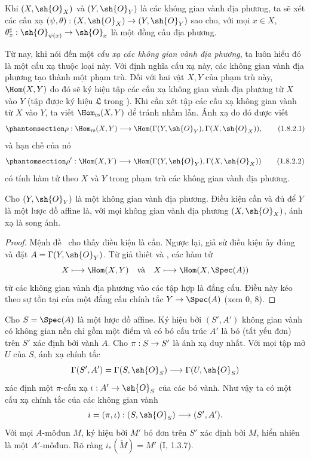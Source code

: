 \documentclass[oneside,10pt]{amsart}
\makeatletter
\newcommand{\ega@arrow}[2]{\mathchoice{#1}{#2}{#2}{#2}}
\renewcommand{\to}{\ega@arrow{\longrightarrow}{\rightarrow}}
\newcommand{\oldpage}[2][]{\marginnote{\normalfont\footnotesize\textbf{#1}~|~#2}\ignorespaces}
\let\EGAOriginalLabel\label
\renewcommand{\label}[1]{\phantomsection\EGAOriginalLabel{#1}}
\makeatother
\begin{document}
\begin{env}[1.8.2]
\label{ega2:addendum:I.1.8.2}
Khi $(X,\sh{O}_X)$ và $(Y,\sh{O}_Y)$ là các không gian vành địa
phương, ta sẽ xét các cấu xạ
$(\psi,\theta):(X,\sh{O}_X)\to(Y,\sh{O}_Y)$ sao cho, với mọi
$x\in X$, $\theta_x^\sharp:\sh{O}_{\psi(x)}\to\sh{O}_x$ là một đồng
cấu địa phương.

Từ nay, khi nói đến một
\oldpage[II]{219}
\emph{cấu xạ các không gian vành địa phương}, ta luôn hiểu đó là một
cấu xạ thuộc loại này. Với định nghĩa cấu xạ này, các không gian vành
địa phương tạo thành một phạm trù. Đối với hai vật $X,Y$ của phạm trù
này, $\Hom(X,Y)$ do đó sẽ ký hiệu tập các cấu xạ không gian vành địa
phương từ $X$ vào $Y$ (tập được ký hiệu $\mathfrak{L}$ trong
). Khi cần xét tập các cấu xạ không gian vành từ $X$ vào
$Y$, ta viết $\Hom_{\mathrm{rs}}(X,Y)$ để tránh nhầm lẫn. Ánh xạ
 do đó được viết
\begin{equation}
\label{ega2:addendum:I.1.8.2.1}
  \rho:\Hom_{\mathrm{rs}}(X,Y)
  \to\Hom(\Gamma(Y,\sh{O}_Y),\Gamma(X,\sh{O}_X)),
\tag{1.8.2.1}
\end{equation}
và hạn chế của nó
\begin{equation}
\label{ega2:addendum:I.1.8.2.2}
  \rho':\Hom(X,Y)
  \to\Hom(\Gamma(Y,\sh{O}_Y),\Gamma(X,\sh{O}_X))
\tag{1.8.2.2}
\end{equation}
có tính hàm tử theo $X$ và $Y$ trong phạm trù các không gian vành địa
phương.
\end{env}

\begin{corollary}[1.8.3]
\label{ega2:addendum:I.1.8.3}
Cho $(Y,\sh{O}_Y)$ là một không gian vành địa phương. Điều kiện cần và
đủ để $Y$ là một lược đồ affine là, với mọi không gian vành địa phương
$(X,\sh{O}_X)$, ánh xạ  là song ánh.
\end{corollary}

\begin{proof}
Mệnh đề~ cho thấy điều kiện là cần. Ngược lại, giả sử
điều kiện ấy đúng và đặt $A=\Gamma(Y,\sh{O}_Y)$. Từ giả thiết và
, các hàm tử
\[
  X\longmapsto\Hom(X,Y)
  \quad\hbox{và}\quad
  X\longmapsto\Hom(X,\Spec(A))
\]
từ các không gian vành địa phương vào các tập hợp là đẳng cấu. Điều
này kéo theo sự tồn tại của một đẳng cấu chính tắc
$Y\to\Spec(A)$ (xem 0, 8).
\end{proof}

\begin{env}[1.8.4]
\label{ega2:addendum:I.1.8.4}
Cho $S=\Spec(A)$ là một lược đồ affine. Ký hiệu bởi $(S',A')$ không
gian vành có không gian nền chỉ gồm một điểm và có bó cấu trúc $A'$ là
bó (tất yếu đơn) trên $S'$ xác định bởi vành $A$. Cho
$\pi:S\to S'$ là ánh xạ duy nhất. Với mọi tập mở $U$ của $S$, ánh xạ
chính tắc
\[
  \Gamma(S',A')=\Gamma(S,\sh{O}_S)\to\Gamma(U,\sh{O}_S)
\]
xác định một $\pi$-cấu xạ $\iota:A'\to\sh{O}_S$ của các bó vành. Như
vậy ta có một cấu xạ chính tắc của các không gian vành
\[
  i=(\pi,\iota):(S,\sh{O}_S)\to(S',A').
\]
Với mọi $A$-môđun $M$, ký hiệu bởi $M'$ bó đơn trên $S'$ xác định bởi
$M$, hiển nhiên là một $A'$-môđun. Rõ ràng
$i_*(\widetilde M)=M'$ (I, 1.3.7).
\end{env}
\end{document}
